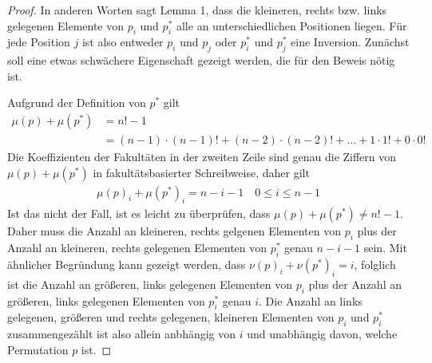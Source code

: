 \documentclass[a4paper, 11pt, ngerman]{article}
\begin{document}
\begin{proof}
    In anderen Worten sagt Lemma 1, dass die kleineren, rechts bzw. links gelegenen Elemente von $p_i$ und $p^*_i$ alle an unterschiedlichen Positionen liegen. Für jede Position $j$ ist also entweder $p_i$ und $p_j$ oder $p^*_i$ und $p^*_j$ eine Inversion. Zunächst soll eine etwas schwächere Eigenschaft gezeigt werden, die für den Beweis nötig ist.

    Aufgrund der Definition von $p^*$ gilt
    \begin{align*}
        \mu(p) + \mu(p^*) & = n! - 1                                                                           \\
                          & =(n - 1) \cdot (n - 1)! + (n - 2) \cdot (n - 2)! + \dots + 1 \cdot 1! + 0 \cdot 0!
    \end{align*}
    Die Koeffizienten der Fakultäten in der zweiten Zeile sind genau die Ziffern von $\mu(p) + \mu(p^*)$ in fakultätsbasierter Schreibweise, daher gilt
    \begin{align*}
        \mu(p)_i + \mu(p^*)_i = n - i - 1 \quad 0 \le i \le n - 1
    \end{align*}
    Ist das nicht der Fall, ist es leicht zu überprüfen, dass $\mu(p) + \mu(p^*) \ne n! - 1$. Daher muss die Anzahl an kleineren, rechts gelgenen Elementen von $p_i$ plus der Anzahl an kleineren, rechts gelegenen Elementen von $p^*_i$ genau $n-i-1$ sein. Mit ähnlicher Begründung kann gezeigt werden, dass $\nu(p)_i + \nu(p^*)_i = i$, folglich ist die Anzahl an größeren, links gelegenen Elementen von $p_i$ plus der Anzahl an größeren, links gelegenen Elementen von $p^*_i$ genau $i$. Die Anzahl an links gelegenen, größeren und rechts gelegenen, kleineren Elementen von $p_i$ und $p^*_i$ zusammengezählt ist also allein anbhängig von $i$ und unabhängig davon, welche Permutation $p$ ist.


\end{proof}
\end{document}
